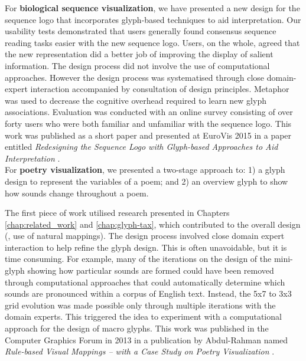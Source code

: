 For \textbf{biological sequence visualization}, we have presented a new design for the sequence logo that incorporates glyph-based techniques to aid interpretation.
Our usability tests demonstrated that users generally found consensus sequence reading tasks easier with the new sequence logo.
Users, on the whole, agreed that the new representation did a better job of improving the display of salient information.
The design process did not involve the use of computational approaches.
However the design process was systematised through close domain-expert interaction accompanied by consultation of design principles.
Metaphor was used to decrease the cognitive overhead required to learn new glyph associations.
Evaluation was conducted with an online survey consisting of over forty users who were both familiar and unfamiliar with the sequence logo. 
This work was published as a short paper and presented at EuroVis 2015 in a paper entitled \emph{Redesigning the Sequence Logo with Glyph-based Approaches to Aid Interpretation} \cite{CGF:maguire14-sp}.\\

For \textbf{poetry visualization}, we presented a two-stage approach to:
1) a glyph design to represent the variables of a poem; and
2) an overview glyph to show how sounds change throughout a poem. 

The first piece of work utilised research presented in Chapters \ref{chap:related_work} and \ref{chap:glyph-tax}, which contributed to the overall design (\eg, use of natural mappings).
The design process involved close domain expert interaction to help refine the glyph design.
This is often unavoidable, but it is time consuming.
For example, many of the iterations on the design of the mini-glyph showing how particular sounds are formed could have been removed through computational approaches that could automatically determine which sounds are pronounced within a corpus of English text.
Instead, the 5x7 to 3x3 grid evolution was made possible only through multiple iterations with the domain experts. 
This triggered the idea to experiment with a computational approach for the design of macro glyphs.
This work was published in the Computer Graphics Forum in 2013 in a publication by Abdul-Rahman \etal named \emph{Rule-based Visual Mappings -- with a Case Study on Poetry Visualization} \cite{CGF:Abd2013a}. 

